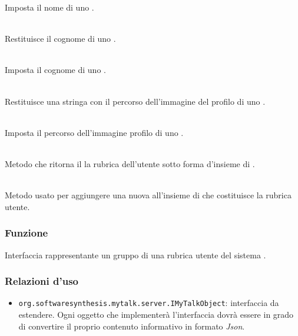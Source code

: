 \begin{description}
	Imposta il nome di uno .
	\item{}\\
	Restituisce il cognome di uno .
	\item{}\\
	Imposta il cognome di uno .
	\item{}\\
	Restituisce una stringa con il percorso dell'immagine del profilo di uno .
	\item{}\\
	Imposta il percorso dell'immagine profilo di uno .
	\item{}\\
	Metodo che ritorna il la rubrica dell'utente sotto forma d'insieme di .
	\item{}\\
	Metodo usato per aggiungere una nuova  all'insieme di  che costituisce la rubrica utente.
\end{description}


\subsubsection*{Funzione}
Interfaccia rappresentante un gruppo di una rubrica utente del sistema \caName.

\subsubsection*{Relazioni d'uso}

\begin{itemize}
		\item \texttt{org.softwaresynthesis.mytalk.server.IMyTalkObject}: interfaccia da estendere. Ogni oggetto che implementerà l'interfaccia  dovrà essere in grado di convertire il proprio contenuto informativo in formato \textit{Json}.
\end{itemize}

